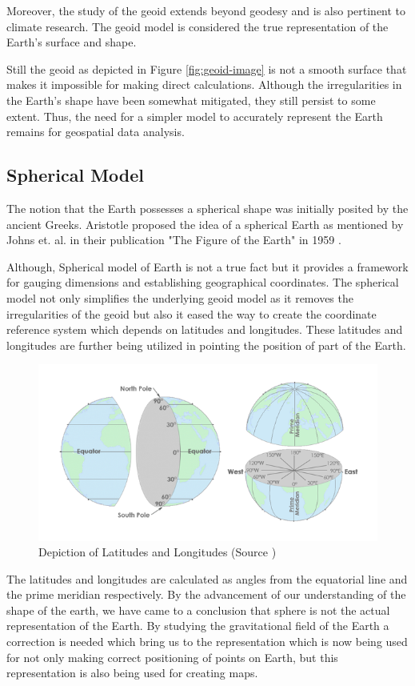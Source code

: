 Moreover, the study of the geoid extends beyond geodesy and is also pertinent to climate research\cite{GISGEO_GEOID}.
The geoid model is considered the true representation of the Earth's surface and shape.



Still the geoid as depicted in Figure \ref{fig:geoid-image} is not a smooth surface that makes it impossible for making direct calculations. Although the irregularities in the Earth's shape have been somewhat mitigated, they still persist to some extent. Thus, the need for a simpler model to accurately represent the Earth remains for geospatial data analysis.


\subsection{Spherical Model}

The notion that the Earth possesses a spherical shape was initially posited by the ancient Greeks. Aristotle proposed the idea of a spherical Earth as
mentioned by Johns et. al. in their publication "The Figure of the Earth" in 1959 \cite{Johns1959-og}.

Although, Spherical model of Earth is not a true fact but it provides a framework for gauging dimensions and establishing geographical coordinates.
The spherical model not only simplifies the underlying geoid model as it removes the irregularities of the geoid but also it eased the way to create the coordinate reference
system which depends on latitudes and longitudes.
These latitudes and longitudes are further being utilized in pointing the position of part of the Earth.
\begin{figure}[H]
    \centering
    \includegraphics[width=0.7\linewidth]{figures/chapter-2/lat_lon.png}
    \caption{Depiction of Latitudes and Longitudes (Source \cite{GISGEO_LatLon}) }
    \label{fig:shpere-image}
\end{figure}

The latitudes and longitudes are calculated as angles from the equatorial line and the prime meridian respectively. By the advancement of our understanding of the shape of the earth, we have came to a conclusion that sphere is not the actual representation of the Earth. By studying the gravitational field of the Earth a
correction is needed which bring us to the representation which is now being used for not only making correct positioning of points on Earth, but this representation is also being used for creating maps.

